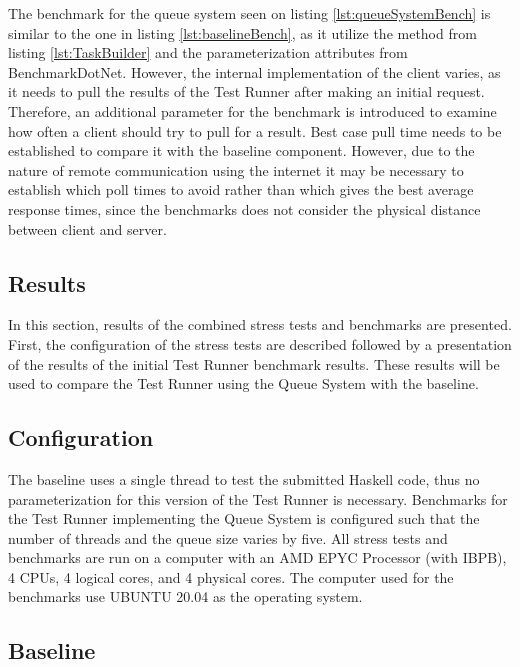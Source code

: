 The benchmark for the queue system seen on listing \ref{lst:queueSystemBench} is similar to the one in listing \ref{lst:baselineBench}, as it utilize the method from listing \ref{lst:TaskBuilder} and the parameterization attributes from BenchmarkDotNet.
However, the internal implementation of the client varies, as it needs to pull the results of the Test Runner after making an initial request.
Therefore, an additional parameter for the benchmark is introduced to examine how often a client should try to pull for a result.
Best case pull time needs to be established to compare it with the baseline component. 
However, due to the nature of remote communication using the internet it may be necessary to establish which poll times to avoid rather than which gives the best average response times, since the benchmarks does not consider the physical distance between client and server.

\subsection{Results}
In this section, results of the combined stress tests and benchmarks are presented.
First, the configuration of the stress tests are described followed by a presentation of the results of the initial Test Runner benchmark results. These results will be used to compare the Test Runner using the Queue System with the baseline.  

\subsection{Configuration}
The baseline uses a single thread to test the submitted Haskell code, thus no parameterization for this version of the Test Runner is necessary.
Benchmarks for the Test Runner implementing the Queue System is configured such that the number of threads and the queue size varies by five. 
All stress tests and benchmarks are run on a computer with an AMD EPYC Processor (with IBPB), 4 CPUs, 4 logical cores, and 4 physical cores. The computer used for the benchmarks use UBUNTU 20.04 as the operating system.

\subsection{Baseline}

